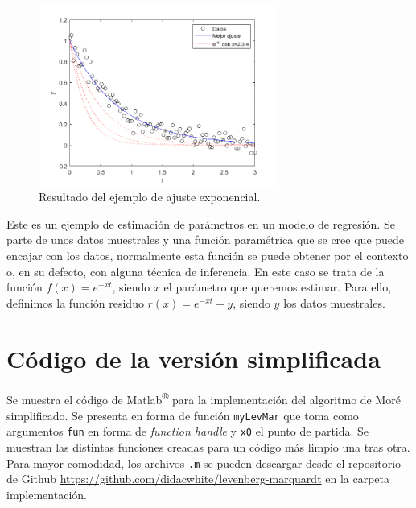 \documentclass[11pt,a4paper]{book}
\theoremstyle{definition}
\theoremstyle{remark}
\def\code#1{\texttt{#1}}
\begin{document}
\begin{figure}[!ht]
	\centering
	\includegraphics[width=0.7\textwidth]{imgs/exp.png}
	\caption{Resultado del ejemplo de ajuste exponencial.}
	\label{out:exp}
\end{figure}

Este es un ejemplo de estimación de parámetros en un modelo de regresión.
Se parte de unos datos muestrales y una función paramétrica que se cree que puede encajar con los datos, normalmente esta función se puede obtener por el contexto o, en su defecto, con alguna técnica de inferencia. En este caso se trata de la función $f(x)=e^{-xt}$, siendo $x$ el parámetro que queremos estimar. Para ello, definimos la función residuo $r(x)=e^{-xt}-y$, siendo $y$ los datos muestrales.



\appendix
\renewcommand{\thechapter}{\Roman{chapter}}
\chapter{Código de la versión simplificada}\label{chap:impl-simpl}
Se muestra el código de Matlab\textsuperscript{®} para la implementación del algoritmo de Moré simplificado. Se presenta en forma de función \code{myLevMar} que toma como argumentos \code{fun} en forma de \textit{function handle} y \code{x0} el punto de partida. Se muestran las distintas funciones creadas para un código más limpio una tras otra. Para mayor comodidad, los archivos \code{.m} se pueden descargar desde el repositorio de Github \url{https://github.com/didacwhite/levenberg-marquardt} en la carpeta implementación.










\end{document}
